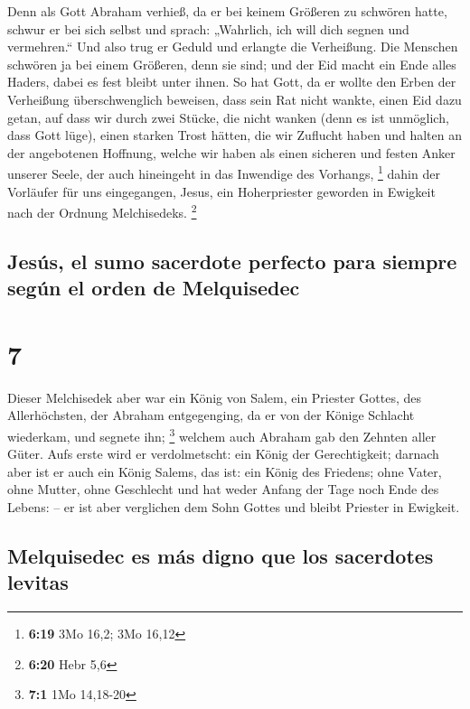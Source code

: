  Denn als Gott Abraham verhieß, da er bei keinem Größeren
zu schwören hatte, schwur er bei sich selbst  und sprach:
„Wahrlich, ich will dich segnen und vermehren.``  Und
also trug er Geduld und erlangte die Verheißung.  Die
Menschen schwören ja bei einem Größeren, denn sie sind; und der Eid
macht ein Ende alles Haders, dabei es fest bleibt unter ihnen.
 So hat Gott, da er wollte den Erben der Verheißung
überschwenglich beweisen, dass sein Rat nicht wankte, einen Eid dazu
getan,  auf dass wir durch zwei Stücke, die nicht wanken
(denn es ist unmöglich, dass Gott lüge), einen starken Trost hätten, die
wir Zuflucht haben und halten an der angebotenen Hoffnung,
 welche wir haben als einen sicheren und festen Anker
unserer Seele, der auch hineingeht in das Inwendige des Vorhangs,
\footnote{\textbf{6:19} 3Mo 16,2; 3Mo 16,12}  dahin der
Vorläufer für uns eingegangen, Jesus, ein Hoherpriester geworden in
Ewigkeit nach der Ordnung Melchisedeks. \footnote{\textbf{6:20} Hebr 5,6}

\hypertarget{jesuxfas-el-sumo-sacerdote-perfecto-para-siempre-seguxfan-el-orden-de-melquisedec}{%
\subsection{Jesús, el sumo sacerdote perfecto para siempre según el
orden de
Melquisedec}\label{jesuxfas-el-sumo-sacerdote-perfecto-para-siempre-seguxfan-el-orden-de-melquisedec}}

\hypertarget{section-6}{%
\section{7}\label{section-6}}

 Dieser Melchisedek aber war ein König von Salem, ein
Priester Gottes, des Allerhöchsten, der Abraham entgegenging, da er von
der Könige Schlacht wiederkam, und segnete ihn; \footnote{\textbf{7:1}
  1Mo 14,18-20}  welchem auch Abraham gab den Zehnten
aller Güter. Aufs erste wird er verdolmetscht: ein König der
Gerechtigkeit; darnach aber ist er auch ein König Salems, das ist: ein
König des Friedens;  ohne Vater, ohne Mutter, ohne
Geschlecht und hat weder Anfang der Tage noch Ende des Lebens: -- er ist
aber verglichen dem Sohn Gottes und bleibt Priester in Ewigkeit.

\hypertarget{melquisedec-es-muxe1s-digno-que-los-sacerdotes-levitas}{%
\subsection{Melquisedec es más digno que los sacerdotes
levitas}\label{melquisedec-es-muxe1s-digno-que-los-sacerdotes-levitas}}

